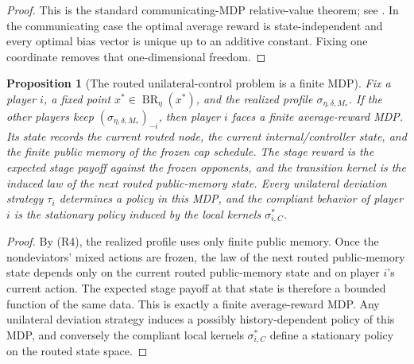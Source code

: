 \documentclass[12pt]{article}
\newtheorem{proposition}[theorem]{Proposition}
\theoremstyle{definition}
\newcommand{\1}{\mathbf{1}}
\DeclareMathOperator{\BR}{BR}
\begin{document}
\begin{proof}
This is the standard communicating-MDP relative-value theorem; see
\cite[Chapter~8]{Puterman1994}. In the communicating case the optimal average
reward is state-independent and every optimal bias vector is unique up to an
additive constant. Fixing one coordinate removes that one-dimensional freedom.
\end{proof}


\begin{proposition}[The routed unilateral-control problem is a finite MDP]
\label{prop:induced-routed-mdp}
Fix a player $i$, a fixed point $x^*\in\BR_\eta(x^*)$, and the realized profile
$\sigma_{\eta,\delta,M_*}$. If the other players keep
$(\sigma_{\eta,\delta,M_*})_{-i}$, then player $i$ faces a finite average-reward
MDP. Its state records the current routed node, the current internal/controller
state, and the finite public memory of the frozen cap schedule. The stage reward
is the expected stage payoff against the frozen opponents, and the transition
kernel is the induced law of the next routed public-memory state. Every
unilateral deviation strategy $\tau_i$ determines a policy in this MDP, and the
compliant behavior of player $i$ is the stationary policy induced by the local
kernels $\sigma_{i,C}^*$.
\end{proposition}

\begin{proof}
By \textnormal{(R4)}, the realized profile uses only
finite public memory. Once the nondeviators' mixed actions are frozen, the law
of the next routed public-memory state depends only on the current routed
public-memory state and on player $i$'s current action. The expected stage payoff
at that state is therefore a bounded function of the same data. This is exactly a
finite average-reward MDP. Any unilateral deviation strategy induces a possibly
history-dependent policy of this MDP, and conversely the compliant local kernels
$\sigma_{i,C}^*$ define a stationary policy on the routed state space.
\end{proof}
\end{document}
